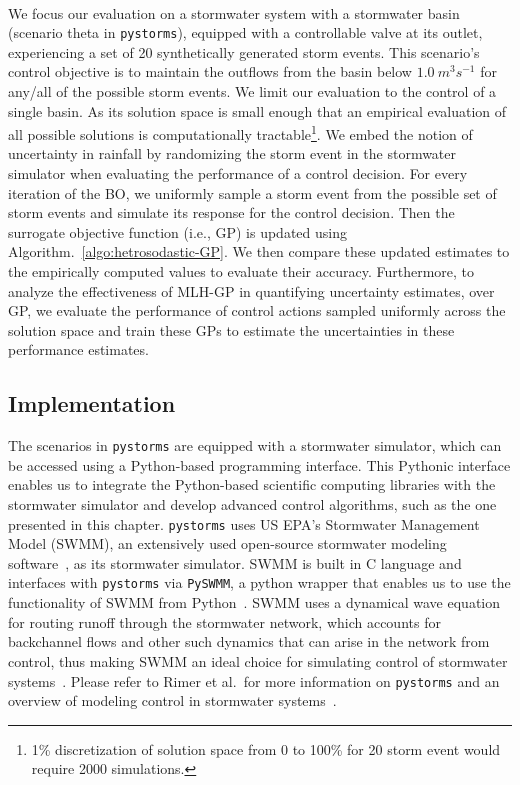 \

We focus our evaluation on a stormwater system with a stormwater basin (scenario theta in \texttt{pystorms}), equipped with a controllable valve at its outlet, experiencing a set of 20 synthetically generated storm events.
This scenario's control objective is to maintain the outflows from the basin below $1.0\ m^3 s^{-1}$ for any/all of the possible storm events.
We limit our evaluation to the control of a single basin. As its solution space is small enough that an empirical evaluation of all possible solutions is computationally tractable\footnote{1\% discretization of solution space from 0 to 100\% for 20 storm event would require 2000 simulations.}.
We embed the notion of uncertainty in rainfall by randomizing the storm event in the stormwater simulator when evaluating the performance of a control decision. 
For every iteration of the BO, we uniformly sample a storm event from the possible set of storm events and simulate its response for the control decision.  
Then the surrogate objective function (i.e., GP) is updated using Algorithm.~\ref{algo:hetrosodastic-GP}. 
We then compare these updated estimates to the empirically computed values to evaluate their accuracy. 
Furthermore, to analyze the effectiveness of MLH-GP in quantifying uncertainty estimates, over GP, we evaluate the performance of control actions sampled uniformly across the solution space and train these GPs to estimate the uncertainties in these performance estimates.

\subsection{Implementation}\label{sec:implementation}
The scenarios in \texttt{pystorms} are equipped with a stormwater simulator, which can be accessed using a Python-based programming interface.
This Pythonic interface enables us to integrate the Python-based scientific computing libraries with the stormwater simulator and develop advanced control algorithms, such as the one presented in this chapter. 
\texttt{pystorms} uses US EPA's Stormwater Management Model (SWMM), an extensively used open-source stormwater modeling software~\cite{rossman2010storm}, as its stormwater simulator.
SWMM is built in C language and interfaces with \texttt{pystorms} via \texttt{PySWMM}, a python wrapper that enables us to use the functionality of SWMM from Python~\cite{mcdonnell_bryant_e_2020_3751574}.
SWMM uses a dynamical wave equation for routing runoff through the stormwater network, which accounts for backchannel flows and other such dynamics that can arise in the network from control, thus making SWMM an ideal choice for simulating control of stormwater systems~\cite{Mullapudi_Wong_Kerkez_2017}. 
Please refer to Rimer et al.\ for more information on \texttt{pystorms} and an overview of modeling control in stormwater systems~\cite{Rimer2019}.

